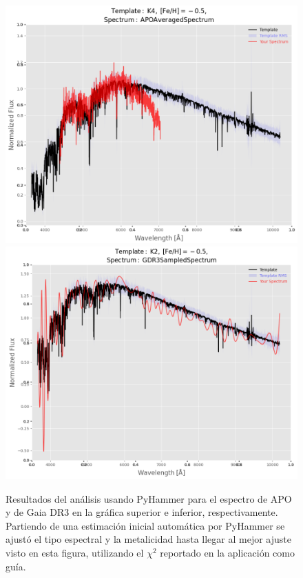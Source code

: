 \begin{figure}[!ht]
    \centering
    \includegraphics[scale=0.5]{Conclusion/Figures/Figura PyHammer APO.png} \\
    \vspace{0.6em}
    \includegraphics[scale=0.5]{Conclusion/Figures/Figura PyHammer GDR3.png}
    \caption{Resultados del análisis usando PyHammer para el espectro de APO y
    de Gaia DR3 en la gráfica superior e inferior, respectivamente. Partiendo de
    una estimación inicial automática por PyHammer se ajustó el tipo espectral y
    la metalicidad hasta llegar al mejor ajuste visto en esta figura, utilizando
    el $\chi^2$ reportado en la aplicación como guía.}
    \label{figuraAjustePyHammer}
\end{figure}

